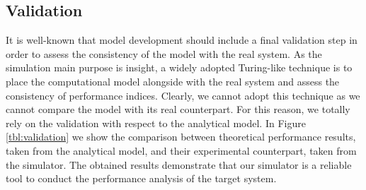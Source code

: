 \subsection{Validation}
It is well-known that model development should include a final validation step in order to assess the consistency of the model with the real system. 
%
As the simulation main purpose is insight, a widely adopted Turing-like technique is to place the computational model alongside with the real system and assess the consistency of performance indices.
%
Clearly, we cannot adopt this technique as we cannot compare the model with its real counterpart.
%
For this reason, we totally rely on the validation with respect to the analytical model. 
In Figure \ref{tbl:validation} we show the comparison between theoretical performance results, taken from the analytical model, and their experimental counterpart, taken from the simulator. 
The obtained results demonstrate that our simulator is a reliable tool to conduct the performance analysis of the target system.

